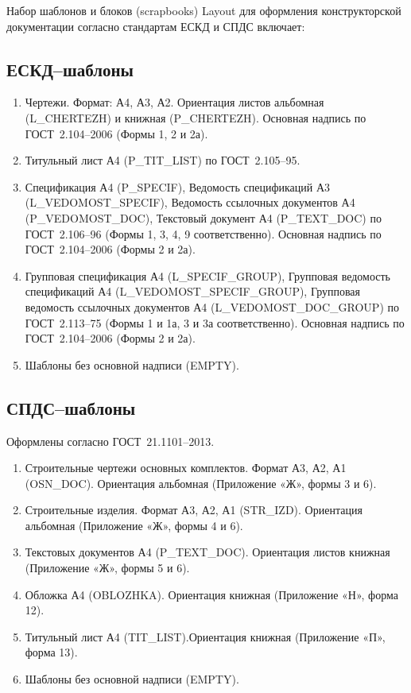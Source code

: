 \documentclass[14pt]{extreport}
\begin{document}
Набор шаблонов и блоков (scrapbooks) Layout для оформления конструкторской документации согласно стандартам ЕСКД и СПДС включает:

\subsection{ЕСКД--шаблоны}

\begin{enumerate}
	\item Чертежи. Формат: А4, А3, А2. Ориентация листов альбомная (\textsf{L\_CHERTEZH}) и книжная (\textsf{P\_CHERTEZH}). Основная надпись по ГОСТ~2.104--2006 (Формы 1, 2 и 2а).
	\item Титульный лист А4 (\textsf{P\_TIT\_LIST}) по ГОСТ~2.105--95.
	\item Спецификация А4 (\textsf{P\_SPECIF}), Ведомость спецификаций А3 (\textsf{L\_VEDOMOST\_SPECIF}), Ведомость ссылочных документов А4 (\textsf{P\_VEDOMOST\_DOC}), Текстовый документ А4 (\textsf{P\_TEXT\_DOC}) по ГОСТ~2.106--96 (Формы 1, 3, 4, 9 соответственно). Основная надпись по ГОСТ~2.104--2006 (Формы 2 и 2а).
	\item Групповая спецификация А4 (\textsf{L\_SPECIF\_GROUP}), Групповая ведомость спецификаций А4  (\textsf{L\_VEDOMOST\_SPECIF\_GROUP}), Групповая ведомость ссылочных документов А4 (\textsf{L\_VEDOMOST\_DOC\_GROUP}) по ГОСТ~2.113--75 (Формы 1 и 1а, 3 и 3а соответственно).  Основная надпись по ГОСТ~2.104--2006 (Формы 2 и 2а).
	\item Шаблоны без основной надписи (\textsf{EMPTY}).
\end{enumerate}

\subsection{СПДС--шаблоны}

Оформлены согласно ГОСТ~21.1101--2013.
\begin{enumerate}
	\item Строительные чертежи основных комплектов. Формат А3, А2, А1 (\textsf{OSN\_DOC}). Ориентация альбомная (Приложение «Ж», формы 3 и 6).
	\item Строительные изделия. Формат А3, А2, А1 (\textsf{STR\_IZD}). Ориентация альбомная (Приложение «Ж», формы 4 и 6).
	\item Текстовых документов А4 (\textsf{P\_TEXT\_DOC}). Ориентация листов книжная (Приложение «Ж», формы 5 и 6).
	\item Обложка А4 (\textsf{OBLOZHKA}). Ориентация книжная (Приложение «Н», форма 12).
	\item Титульный лист А4 (\textsf{TIT\_LIST}).Ориентация книжная (Приложение «П», форма 13).
	\item Шаблоны без основной надписи (\textsf{EMPTY}).
\end{enumerate}
\end{document}
